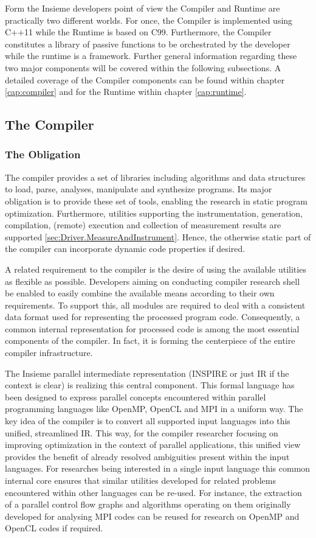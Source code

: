 Form the Insieme developers point of view the Compiler and Runtime are
practically two different worlds. For once, the Compiler is implemented using
C++11 while the Runtime is based on C99. Furthermore, the Compiler constitutes a
library of passive functions to be orchestrated by the developer while the
runtime is a framework. Further general information regarding these two major
components will be covered within the following subsections. A detailed
coverage of the Compiler components can be found within chapter
\ref{cap:compiler} and for the Runtime within chapter \ref{cap:runtime}.


\subsection{The Compiler}

\subsubsection{The Obligation}
The compiler provides a set of libraries including algorithms and data
structures to load, parse, analyses, manipulate and synthesize programs. Its
major obligation is to provide these set of tools, enabling the research in
static program optimization. Furthermore, utilities supporting the
instrumentation, generation, compilation, (remote) execution and collection of
measurement results are supported \ref{sec:Driver.MeasureAndInstrument}. Hence,
the otherwise static part of the compiler can incorporate dynamic code
properties if desired.

A related requirement to the compiler is the desire of using the available
utilities as flexible as possible. Developers aiming on conducting compiler
research shell be enabled to easily combine the available means according to
their own requirements. To support this, all modules are required to deal with a
consistent data format used for representing the processed program code.
Consequently, a common internal representation for processed code is among the
most essential components of the compiler. In fact, it is forming the
centerpiece of the entire compiler infrastructure.

The Insieme parallel intermediate representation (INSPIRE or just IR if the
context is clear) is realizing this central component. This formal language has
been designed to express parallel concepts encountered within parallel
programming languages like OpenMP, OpenCL and MPI in a uniform way. The key idea
of the compiler is to convert all supported input languages into this unified,
streamlined IR. This way, for the compiler researcher focusing on improving
optimization in the context of parallel applications, this unified view provides
the benefit of already resolved ambiguities present within the input languages.
For researches being interested in a single input language this common internal
core ensures that similar utilities developed for related problems encountered
within other languages can be re-used. For instance, the extraction of a
parallel control flow graphs and algorithms operating on them
originally developed for analysing MPI codes can be reused for research on
OpenMP and OpenCL codes if required.

